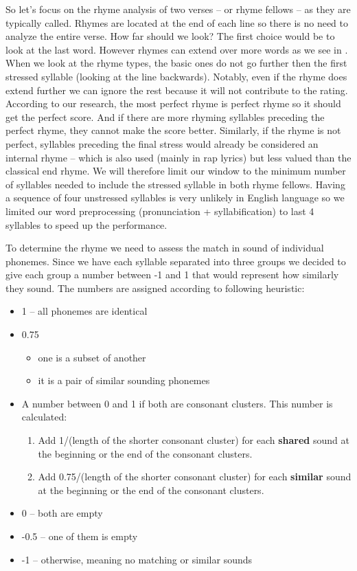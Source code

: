 So let's focus on the rhyme analysis of two verses -- or rhyme fellows -- as they are typically called. Rhymes are located at the end of each line so there is no need to analyze the entire verse. How far should we look? The first choice would be to look at the last word. However rhymes can extend over more words as we see in . When we look at the rhyme types, the basic ones do not go further then the first stressed syllable (looking at the line backwards). Notably, even if the rhyme does extend further we can ignore the rest because it will not contribute to the rating. According to our research, the most perfect rhyme is perfect rhyme so it should get the perfect score. And if there are more rhyming syllables preceding the perfect rhyme, they cannot make the score better. Similarly, if the rhyme is not perfect, syllables preceding the final stress would already be considered an internal rhyme -- which is also used (mainly in rap lyrics) but less valued than the classical end rhyme. We will therefore limit our window to the minimum number of syllables needed to include the stressed syllable in both rhyme fellows. Having a sequence of four unstressed syllables is very unlikely in English language so we limited our word preprocessing (pronunciation + syllabification) to last 4 syllables to speed up the performance.

To determine the rhyme we need to assess the match in sound of individual phonemes. Since we have each syllable separated into three groups we decided to give each group a number between -1 and 1 that would represent how similarly they sound. The numbers are assigned according to following heuristic:
\begin{itemize}
	\item 1 -- all phonemes are identical
	\item 0.75
	\begin{itemize}
		\item one is a subset of another
		\item it is a pair of similar sounding phonemes
	\end{itemize}
	\item A number between 0 and 1 if both are consonant clusters. This number is calculated:
	\begin{enumerate}
		\item Add 1/(length of the shorter consonant cluster) for each \textbf{shared} sound at the beginning or the end of the consonant clusters.
		\item Add 0.75/(length of the shorter consonant cluster) for each \textbf{similar} sound at the beginning or the end of the consonant clusters.
	\end{enumerate}
	\item 0 -- both are empty
	\item -0.5 -- one of them is empty
	\item -1 -- otherwise, meaning no matching or similar sounds
	
\end{itemize}

